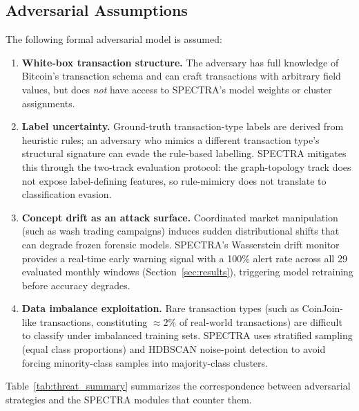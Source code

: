 \documentclass[journal]{IEEEtran}
\newcommand{\spectra}{\textsc{SPECTRA}}
\begin{document}
\subsection{Adversarial Assumptions}
\label{subsec:adversarial_assumptions}

The following formal adversarial model is assumed:

\begin{enumerate}[leftmargin=*, label=\textbf{A\arabic*}]
  \item \textbf{White-box transaction structure.}  The adversary has full
    knowledge of Bitcoin's transaction schema and can craft transactions with
    arbitrary field values, but does \emph{not} have access to \spectra{}'s
    model weights or cluster assignments.

  \item \textbf{Label uncertainty.}  Ground-truth transaction-type labels are
    derived from heuristic rules; an adversary who mimics a different
    transaction type's structural signature can evade the rule-based labelling.
    \spectra{} mitigates this through the two-track evaluation protocol: the
    graph-topology track does not expose label-defining features, so
    rule-mimicry does not translate to classification evasion.

  \item \textbf{Concept drift as an attack surface.}  Coordinated market
    manipulation (such as wash trading campaigns) induces sudden distributional
    shifts that can degrade frozen forensic models.
    \spectra{}'s Wasserstein drift monitor provides a real-time early warning
    signal with a 100\% alert rate across all 29 evaluated monthly windows
    (Section~\ref{sec:results}), triggering model retraining before accuracy
    degrades.

  \item \textbf{Data imbalance exploitation.}  Rare transaction types
    (such as CoinJoin-like transactions, constituting $\approx 2\%$ of
    real-world transactions) are difficult to classify under imbalanced
    training sets.
    \spectra{} uses stratified sampling (equal class proportions) and HDBSCAN
    noise-point detection to avoid forcing minority-class samples into
    majority-class clusters.
\end{enumerate}

Table~\ref{tab:threat_summary} summarizes the correspondence between
adversarial strategies and the \spectra{} modules that counter them.
\end{document}
